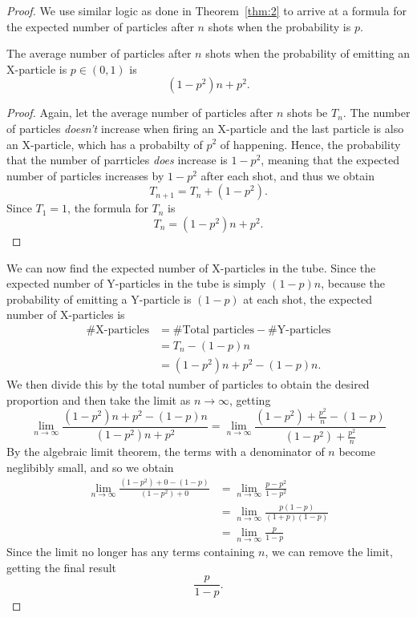 \begin{proof}
  We use similar logic as done in Theorem~\ref{thm:2} to arrive at a formula for the expected number of particles after $n$ shots when the probability is $p$.
  \begin{claim}
    The average number of particles after $n$ shots when the probability of emitting an X-particle is $p \in (0, 1)$ is \[
      (1-p^2)n + p^2
    .\] 
  \end{claim}
  \begin{proof}
    Again, let the average number of particles after $n$ shots be $T_n$. The number of particles \emph{doesn't} increase when firing an X-particle and the last particle is also an X-particle, which has a probabilty of $p^2$ of happening. Hence, the probability that the number of parrticles \emph{does} increase is $1-p^2$, meaning that the expected number of particles increases by $1-p^2$ after each shot, and thus we obtain \[
      T_{n+1} = T_{n} + (1-p^2)
    .\] Since $T_1 = 1$, the formula for $T_{n}$ is \[
      T_{n} = (1-p^2)n + p^2 \tag*{\qedhere}
    .\] 
  \end{proof}
  We can now find the expected number of X-particles in the tube. Since the expected number of Y-particles in the tube is simply $(1 - p)n$, because the probability of emitting a Y-particle is $(1-p)$ at each shot, the expected number of X-particles is 
  \begin{align*}
    \#\text{X-particles} &= \#\text{Total particles} - \#\text{Y-particles} \\
                         &= T_n - (1-p)n \\
                         &= (1-p^2)n + p^2 - (1-p)n.
  \end{align*}
  We then divide this by the total number of particles to obtain the desired proportion and then take the limit as $n \to \infty$, getting 
  \begin{equation*}
    \lim_{n \to \infty} \frac{(1-p^2)n + p^2 - (1-p)n}{(1-p^2)n + p^2} = \lim_{n \to \infty} \frac{(1-p^2) + \frac{p^2}{n} - (1-p)}{(1-p^2) + \frac{p^2}{n}}
  \end{equation*}
  By the algebraic limit theorem, the terms with a denominator of $n$ become neglibibly small, and so we obtain 
  \begin{align*}
    \lim_{n \to \infty} \frac{(1-p^2) + 0 - (1-p)}{(1-p^2) + 0} &= \lim_{n \to \infty} \frac{p - p^2}{1 - p^2} \\
                                                                &= \lim_{n \to \infty} \frac{p(1 - p)}{(1+p)(1-p)} \\
                                                                &= \lim_{n \to \infty} \frac{p}{1-p}
  \end{align*}
  Since the limit no longer has any terms containing $n$, we can remove the limit, getting the final result \[
    \frac{p}{1-p} \tag*{\qedhere}
  .\] 
\end{proof}
